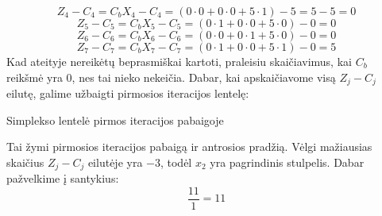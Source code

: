 \documentclass{article}
\begin{document}
\begin{equation*}
    Z_4-C_4=C_bX_4-C_4=(0\cdot0+0\cdot0+5\cdot1)-5=5-5=0
\end{equation*}
\begin{equation*}
    Z_5-C_5=C_bX_5-C_5=(0\cdot1+0\cdot0+5\cdot0)-0=0
\end{equation*}
\begin{equation*}
    Z_6-C_6=C_bX_6-C_6=(0\cdot0+0\cdot1+5\cdot0)-0=0
\end{equation*}
\begin{equation*}
    Z_7-C_7=C_bX_7-C_7=(0\cdot1+0\cdot0+5\cdot1)-0=5
\end{equation*}
Kad ateityje nereikėtų beprasmiškai kartoti, praleisiu skaičiavimus, kai $C_b$ reikšmė yra 0, nes tai nieko nekeičia. Dabar, kai apskaičiavome visą $Z_j-C_j$ eilutę, galime užbaigti pirmosios iteracijos lentelę:
\begin{table}[H]
    \centering
    \caption{Simplekso lentelė pirmos iteracijos pabaigoje}
    \label{table:2}
\end{table}
Tai žymi pirmosios iteracijos pabaigą ir antrosios pradžią. Vėlgi mažiausias skaičius $Z_j-C_j$ eilutėje yra $-3$, todėl $x_2$ yra pagrindinis stulpelis. Dabar pažvelkime į santykius:
\begin{equation*}
    \frac{11}{1} = 11
\end{equation*}
\end{document}
